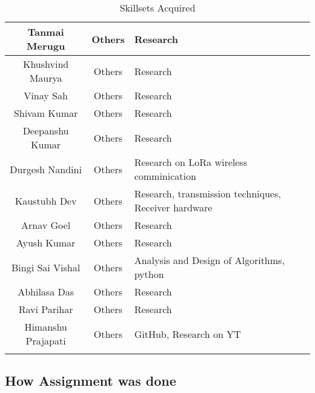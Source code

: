 \begin{center}
\begin{longtable}{ | c | c | m{6cm} | }
        Tanmai Merugu & Others & Research\\ 
        \hline 
        Khushvind Maurya & Others & Research\\ 
        \hline 
        Vinay Sah & Others & Research\\ 
        \hline 
        Shivam Kumar & Others & Research\\ 
        \hline 
        Deepanshu Kumar & Others & Research\\ 
        \hline 
        Durgesh Nandini & Others & Research on LoRa wireless comminication\\ 
        \hline 
        Kaustubh Dev & Others & Research, transmission techniques, Receiver hardware\\ 
        \hline 
        Arnav Goel & Others & Research\\ 
        \hline 
        Ayush Kumar & Others & Research\\ 
        \hline 
        Bingi Sai Vishal & Others & Analysis and Design of Algorithms, python\\ 
        \hline 
        Abhilasa Das & Others & Research\\ 
        \hline 
        Ravi Parihar & Others & Research\\ 
        \hline 
        Himanshu Prajapati & Others & GitHub, Research on YT\\ 
        \hline 


		\hline
		\caption{Skillsets Acquired}
	\end{longtable}
\end{center}

\subsection{How Assignment was done}



